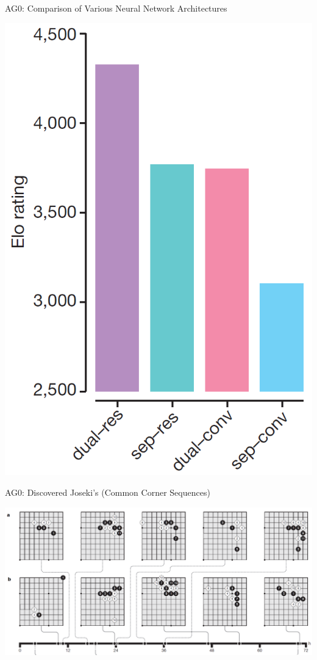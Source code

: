 \documentclass{beamer}
\begin{document}
{    \begin{frame}{AG0: Comparison of Various Neural Network Architectures}
      \begin{center}
        \includegraphics[height=.9\textheight]{../img/AG0-paper/nn-arch-vs-elo.png}
      \end{center}
    \end{frame}

    \begin{frame}{AG0: Discovered Joseki's (Common Corner Sequences)}
      \begin{center}
        \includegraphics[width=\textwidth]{../img/AG0-paper/discovered-openings.png}
      \end{center}
    \end{frame}

}
\end{document}
